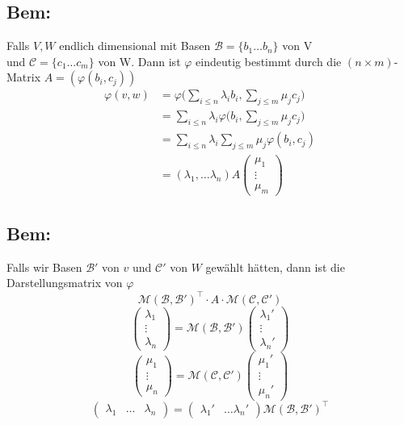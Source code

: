 \documentclass[titlepage,12pt,a4paper,ngerman]{report}
\begin{document}
\subsection*{Bem:} Falls $V, W$ endlich dimensional mit Basen $\mathcal B = \{b_1 \dots b_n\}$ von V\\
und $\mathcal C = \{c_1 \dots c_m\}$ von W. Dann ist $\varphi$ eindeutig bestimmt durch die $(n \times m)$-Matrix $A= (\varphi(b_i, c_j))$
\begin{align*}
\varphi(v, w) &= \varphi \bigg(\sum_{i \leq n} \lambda_i b_i, \sum_{j \leq m}\mu_j c_j\bigg)\\
&= \sum_{i \leq n} \lambda_i \varphi \bigg(b_i, \sum_{j \leq m} \mu_j c_j \bigg)\\
&= \sum_{i \leq n} \lambda_i \sum_{j \leq m} \mu_j \varphi(b_i, c_j)\\
&= (\lambda_1, \dots \lambda_n)A \begin{pmatrix}
\mu_1 \\ \vdots \\ \mu_m
\end{pmatrix}
\end{align*}

\subsection{Bem:}
Falls wir Basen $ \mathcal{B}' $ von $ v $ und $ \mathcal{C}' $ von $ W $ gewählt hätten, dann ist die Darstellungsmatrix von $ \varphi $
$$\mathcal{M}(\mathcal{B},\mathcal{B}')^\top \cdot A \cdot \mathcal{M}(\mathcal{C}, \mathcal{C}')$$
$$ \begin{pmatrix}
\lambda_1\\
\vdots\\
\lambda_n
\end{pmatrix} = \mathcal{M}(\mathcal{B},\mathcal{B}') \begin{pmatrix}
\lambda_1'\\
\vdots\\
\lambda_n'
\end{pmatrix}$$
$$ \begin{pmatrix}
\mu_1\\
\vdots\\
\mu_n
\end{pmatrix} = \mathcal{M}(\mathcal{C},\mathcal{C}') \begin{pmatrix}
\mu_1'\\
\vdots\\
\mu_n'
\end{pmatrix}$$
$$\begin{pmatrix}
\lambda_1 & \dots & \lambda_n
\end{pmatrix} = \begin{pmatrix}
\lambda_1' & \dots \lambda_n'
\end{pmatrix} \mathcal{M}(\mathcal{B},\mathcal{B}')^\top$$
\end{document}
